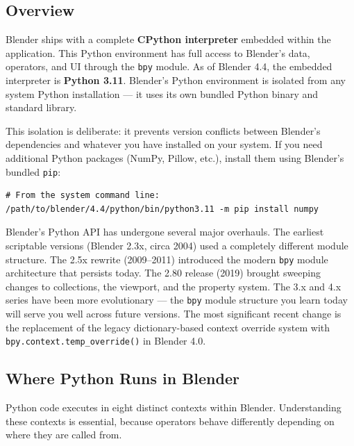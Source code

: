 \subsection{Overview}

Blender ships with a complete \textbf{CPython interpreter} embedded within the application. This Python environment has full access to Blender's data, operators, and UI through the \texttt{bpy} module. As of Blender 4.4, the embedded interpreter is \textbf{Python 3.11}. Blender's Python environment is isolated from any system Python installation --- it uses its own bundled Python binary and standard library.

This isolation is deliberate: it prevents version conflicts between Blender's dependencies and whatever you have installed on your system. If you need additional Python packages (NumPy, Pillow, etc.), install them using Blender's bundled \texttt{pip}:

\begin{lstlisting}
# From the system command line:
/path/to/blender/4.4/python/bin/python3.11 -m pip install numpy
\end{lstlisting}

\begin{historynote}
Blender's Python API has undergone several major overhauls. The earliest scriptable versions (Blender 2.3x, circa 2004) used a completely different module structure. The 2.5x rewrite (2009--2011) introduced the modern \texttt{bpy} module architecture that persists today. The 2.80 release (2019) brought sweeping changes to collections, the viewport, and the property system. The 3.x and 4.x series have been more evolutionary --- the \texttt{bpy} module structure you learn today will serve you well across future versions. The most significant recent change is the replacement of the legacy dictionary-based context override system with \texttt{bpy.context.temp\_override()} in Blender 4.0.
\end{historynote}

\subsection{Where Python Runs in Blender}

Python code executes in eight distinct contexts within Blender. Understanding these contexts is essential, because operators behave differently depending on where they are called from.

